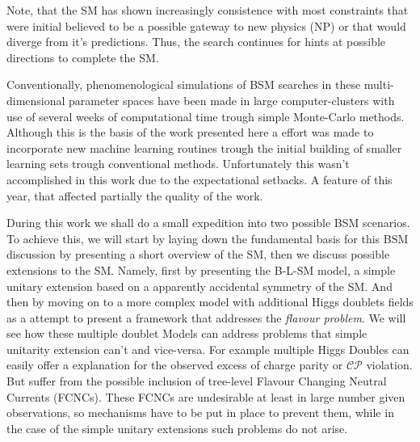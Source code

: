 
Note, that the SM has shown increasingly consistence with most constraints that were initial believed to be a possible gateway to new physics (NP) or that would diverge from it's predictions. Thus, the search continues for hints at possible directions to complete the SM. %

Conventionally, phenomenological simulations of BSM searches in these multi-dimensional parameter spaces have been made in large computer-clusters with use of several weeks of computational time trough simple Monte-Carlo methods. 
%
Although this is the basis of the work presented here a effort was made to incorporate new machine learning routines trough the initial building of smaller learning sets trough conventional methods. 
%
Unfortunately this wasn't accomplished in this work due to the expectational setbacks. A feature of this year, that affected partially the quality of the work. 


During this work we shall do a small expedition into two possible BSM scenarios.
%
To achieve this, we will start by laying down the fundamental basis for this BSM discussion by presenting a short overview of the SM, then we discuss possible extensions to the SM. Namely, first by presenting the B-L-SM model, a simple unitary extension based on a apparently accidental symmetry of the SM. 
%
And then by moving on to a more complex model with additional Higgs doublets fields as a attempt to present a framework that addresses the \textit{flavour problem}. 
%
We will see how these multiple doublet Models can address problems that simple unitarity extension can't and vice-versa. For example multiple Higgs Doubles can easily offer a explanation for the observed excess of charge parity or $\mathcal{CP}$ violation. But suffer from the possible inclusion of tree-level Flavour Changing Neutral Currents (FCNCs). These FCNCs are undesirable at least in large number given observations, so mechanisms have to be put in place to prevent them, while in the case of the simple unitary extensions such problems do not arise. 

%

